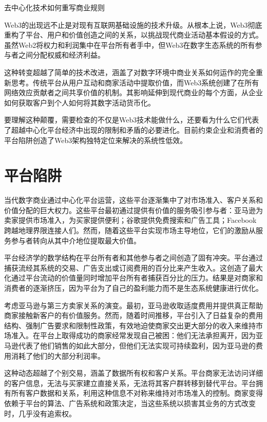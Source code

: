 \documentclass[
  Letterpaper,
]{scrbook}
\begin{document}
去中心化技术如何重写商业规则

Web3的出现远不止是对现有互联网基础设施的技术升级。从根本上说，Web3彻底重构了平台、用户和价值创造之间的关系，以挑战现代商业活动基本假设的方式。虽然Web2将权力和利润集中在平台所有者手中，但Web3在数字生态系统的所有参与者之间分配权威和经济利益。

这种转变超越了简单的技术改进，涵盖了对数字环境中商业关系如何运作的完全重新思考。传统平台从用户互动和商家活动中提取价值，而Web3系统创建了在所有网络效应贡献者之间共享价值的机制。其影响延伸到现代商业的每个方面，从企业如何获取客户到个人如何将其数字活动货币化。

要理解这种颠覆，需要检查的不仅是Web3技术能做什么，还要看为什么它们代表了超越中心化平台经济中出现的限制和矛盾的必要进化。目前约束企业和消费者的平台陷阱创造了Web3架构独特定位来解决的系统性低效。

\section{平台陷阱}\label{ux5e73ux53f0ux9677ux9631}

当代数字商业通过中心化平台运营，这些平台逐渐集中了对市场准入、客户关系和价值分配的巨大权力。这些平台最初通过提供有价值的服务吸引参与者：亚马逊为卖家提供市场准入，为买家提供便利；谷歌提供免费搜索和广告工具；Facebook跨越地理界限连接人们。然而，随着这些平台实现市场主导地位，它们的激励从服务参与者转向从其中介地位提取最大价值。

平台经济学的数学结构在平台所有者和其他参与者之间创造了固有冲突。平台通过捕获流经其系统的交易、广告支出或订阅费用的百分比来产生收入。这创造了最大化通过平台流动的价值量同时增加平台所有者捕获百分比的压力。结果是对商家和消费者的逐渐挤压，因为平台为了自己的盈利能力而不是生态系统健康进行优化。

考虑亚马逊与第三方卖家关系的演变。最初，亚马逊收取适度费用并提供真正帮助商家接触新客户的有价值服务。然而，随着时间推移，平台引入了日益复杂的费用结构、强制广告要求和限制性政策，有效地迫使商家交出更大部分的收入来维持市场准入。在平台上取得成功的商家经常发现自己被困：他们无法承担离开，因为亚马逊代表了他们销售的如此大部分，但他们无法实现可持续盈利，因为亚马逊的费用消耗了他们的大部分利润率。

这种动态超越了个别交易，涵盖了数据所有权和客户关系。平台商家无法访问详细的客户信息，无法与买家建立直接关系，无法将其客户群转移到替代平台。平台拥有所有客户数据和关系，利用这种信息不对称来维持对市场准入的控制。商家变得依赖于平台的算法、广告系统和政策决定，当这些系统以损害其业务的方式改变时，几乎没有追索权。
\end{document}
